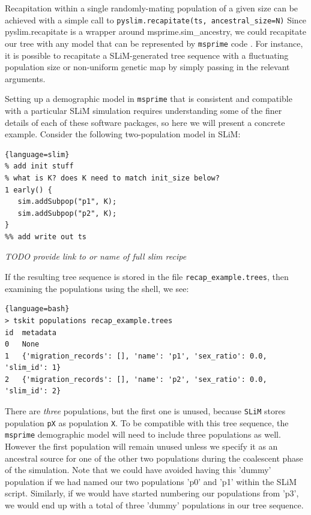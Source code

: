 \documentclass[12pt]{article}
\newcommand{\msprime}[0]{\texttt{msprime}\xspace}
\newcommand{\slim}[0]{\texttt{SLiM}\xspace}
\newcommand{\comment}[1]{\textit{\color{green} #1}}
\begin{document}
Recapitation within a single randomly-mating population of a given size
can be achieved with a simple call to \verb|pyslim.recapitate(ts, ancestral_size=N)|
Since pyslim.recapitate is a wrapper around
msprime.sim\_ancestry, we could recapitate our tree with any model that can be represented by \msprime code
\citep{baumdicker}. For instance, it is possible to recapitate a SLiM-generated tree sequence with a fluctuating population size
or non-uniform genetic map by simply passing in the relevant arguments.

Setting up a demographic model in \msprime that is consistent and compatible with a particular SLiM simulation requires
understanding some of the finer details of each of these software packages, so here we will present a concrete example.
Consider the following two-population model in SLiM:

\begin{lstlisting}{language=slim}
% add init stuff
% what is K? does K need to match init_size below?
1 early() {
   sim.addSubpop("p1", K);
   sim.addSubpop("p2", K);
}
%% add write out ts
\end{lstlisting}
\comment{TODO provide link to or name of full slim recipe}

If the resulting tree sequence is stored in the file \texttt{recap_example.trees},
then examining the populations using the shell, we see:
\begin{lstlisting}{language=bash}
> tskit populations recap_example.trees
id	metadata
0	None
1	{'migration_records': [], 'name': 'p1', 'sex_ratio': 0.0, 'slim_id': 1}
2	{'migration_records': [], 'name': 'p2', 'sex_ratio': 0.0, 'slim_id': 2}
\end{lstlisting}

There are \emph{three} populations, but the first one is unused, because \slim stores population \texttt{pX} as population \texttt{X}.
To be compatible with this tree sequence, the \msprime demographic model will need to include three populations as well.
However the first population will remain unused unless we specify it as an ancestral source for
one of the other two populations during the coalescent phase of the simulation. Note that we could have avoided having this
'dummy' population if we had named our two populations 'p0' and 'p1' within the SLiM script. Similarly, if we would have started
numbering our populations from 'p3', we would end up with a total of three 'dummy' populations in our tree sequence.
\end{document}
